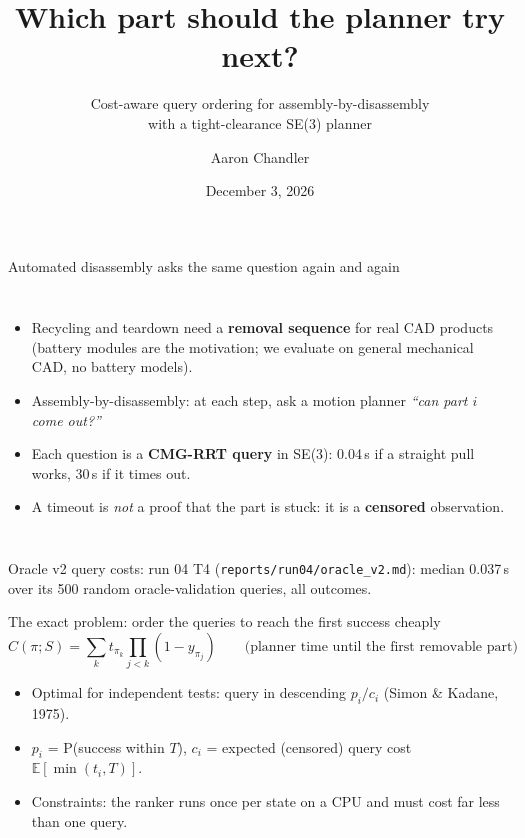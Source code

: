 \documentclass[aspectratio=169,11pt]{beamer}
\title{Which part should the planner try next?}
\subtitle{Cost-aware query ordering for assembly-by-disassembly\\with a tight-clearance SE(3) planner}
\author{Aaron Chandler}
\institute{CMPE 258 Deep Learning, San Jos\'e State University}
\date{December 3, 2026}
\newcommand{\src}[1]{\vfill{\tiny\color{gr}#1}}
\begin{document}
\begin{frame}
\titlepage
\end{frame}

\begin{frame}{Automated disassembly asks the same question again and again}
\begin{columns}
\begin{itemize}
\item Recycling and teardown need a \textbf{removal sequence} for real CAD products (battery modules are the
motivation; we evaluate on general mechanical CAD, no battery models).
\item Assembly-by-disassembly: at each step, ask a motion planner \emph{``can part $i$ come out?''}
\item Each question is a \textbf{CMG-RRT query} in SE(3): \textcolor{blu}{0.04\,s} if a straight pull works,
\textcolor{acc}{30\,s} if it times out.
\item A timeout is \emph{not} a proof that the part is stuck: it is a \textbf{censored} observation.
\end{itemize}
\centering
{}
\end{columns}
\src{Oracle v2 query costs: run 04 T4 (\texttt{reports/run04/oracle\_v2.md}): median 0.037\,s over its 500 random oracle-validation queries, all outcomes.}
\end{frame}

\begin{frame}{The exact problem: order the queries to reach the first success cheaply}
\[
C(\pi;S)=\sum_{k} t_{\pi_k}\prod_{j<k}(1-y_{\pi_j})
\qquad\text{(planner time until the first removable part)}
\]
\begin{itemize}
\item Optimal for independent tests: query in descending $p_i/c_i$ (Simon \& Kadane, 1975).
\item $p_i$ = P(success within $T$), $c_i$ = expected (censored) query cost $\mathbb{E}[\min(t_i,T)]$.
\item Constraints: the ranker runs once per state on a CPU and must cost far less than one query.
\end{itemize}
\end{frame}
\end{document}
